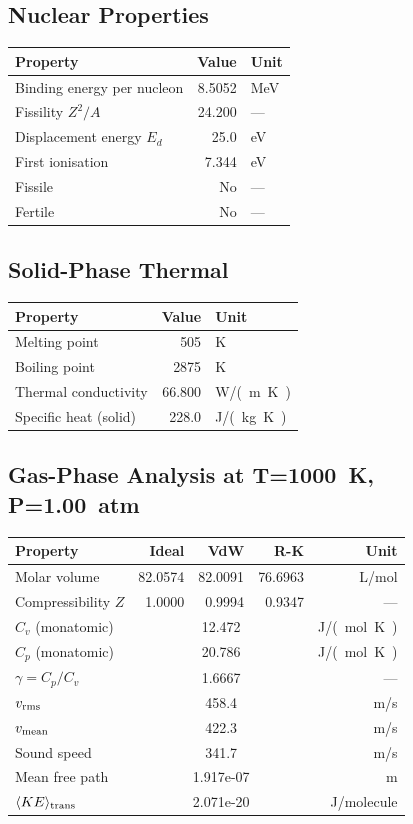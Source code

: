 \documentclass[11pt,a4paper]{article}
\begin{document}
\subsection{Nuclear Properties}
\begin{tabular}{lrl}
  \toprule
  Property & Value & Unit \\
  \midrule
  Binding energy per nucleon & 8.5052 & \si{MeV} \\
  Fissility $Z^2/A$ & 24.200 & --- \\
  Displacement energy $E_d$ & 25.0 & \si{eV} \\
  First ionisation & 7.344 & \si{eV} \\
  Fissile & No & --- \\
  Fertile & No & --- \\
  \bottomrule
\end{tabular}

\subsection{Solid-Phase Thermal}
\begin{tabular}{lrl}
  \toprule
  Property & Value & Unit \\
  \midrule
  Melting point & 505 & \si{K} \\
  Boiling point & 2875 & \si{K} \\
  Thermal conductivity & 66.800 & \si{W/(m.K)} \\
  Specific heat (solid) & 228.0 & \si{J/(kg.K)} \\
  \bottomrule
\end{tabular}

\subsection{Gas-Phase Analysis at T=\SI{1000}{K}, P=\SI{1.00}{atm}}
\begin{tabular}{lrrrr}
  \toprule
  Property & Ideal & VdW & R-K & Unit \\
  \midrule
  Molar volume & 82.0574 & 82.0091 & 76.6963 & \si{L/mol} \\
  Compressibility $Z$ & 1.0000 & 0.9994 & 0.9347 & --- \\
  \midrule
  $C_v$ (monatomic) & \multicolumn{3}{c}{12.472} & \si{J/(mol.K)} \\
  $C_p$ (monatomic) & \multicolumn{3}{c}{20.786} & \si{J/(mol.K)} \\
  $\gamma = C_p/C_v$ & \multicolumn{3}{c}{1.6667} & --- \\
  $v_{\rm rms}$ & \multicolumn{3}{c}{458.4} & \si{m/s} \\
  $v_{\rm mean}$ & \multicolumn{3}{c}{422.3} & \si{m/s} \\
  Sound speed & \multicolumn{3}{c}{341.7} & \si{m/s} \\
  Mean free path & \multicolumn{3}{c}{1.917e-07} & \si{m} \\
  $\langle KE \rangle_{\rm trans}$ & \multicolumn{3}{c}{2.071e-20} & \si{J/molecule} \\
  \bottomrule
\end{tabular}
\end{document}
